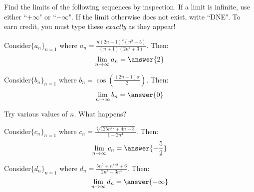 \documentclass{ximera}
\author{Jim Talamo}
\begin{document}
\begin{exercise}

Find the limits of the following sequences by inspection.  If a limit is infinite, use either ``$+\infty$" or ``$-\infty$".  If the limit otherwise does not exist, write ``DNE".  To earn credit, you must type these \emph{exactly} as they appear!

\begin{exercise}
Consider$\{a_n \}_{n=1}$ where $a_n = \frac{n(2n+1)^2(n^2-5)}{(n+1)(2n^4+3)}$.  Then:
\[
\lim_{n \to \infty} a_n = \answer{2}
\]
\end{exercise}

\begin{exercise}
Consider$\{b_n \}_{n=1}$ where $b_n = \cos \left(\frac{(2n+1)\pi}{2}\right)$.  Then:
\[
\lim_{n \to \infty} b_n = \answer{0}
\]

\begin{hint}
Try various values of $n$.  What happens?
\end{hint}
\end{exercise}

\begin{exercise}
Consider$\{c_n \}_{n=1}$ where $c_n = \frac{\sqrt[3]{125n^{12}+4n+3}}{1-2n^4}$.  Then:
\[
\lim_{n \to \infty} c_n = \answer{-\frac{5}{2}}
\]
\end{exercise}

\begin{exercise}
Consider$\{d_n \}_{n=1}$ where $d_n = \frac{5n^5+n^{8/2}+6}{2n^3-3n^4}$.  Then:
\[
\lim_{n \to \infty} d_n =  \answer{-\infty}
\]
\end{exercise}


\end{exercise}
\end{document}
